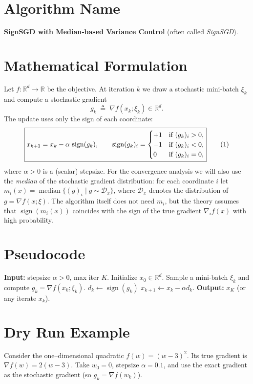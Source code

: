 \documentclass{article}
\newcommand{\sign}{\operatorname{sign}}
\begin{document}
\section*{Algorithm Name}
\textbf{SignSGD with Median‑based Variance Control} (often called \emph{SignSGD}).

\section*{Mathematical Formulation}
Let $f:\mathbb{R}^d\to\mathbb{R}$ be the objective. At iteration $k$ we draw a stochastic mini‑batch $\xi_k$ and compute a stochastic gradient
\[
g_k\;\triangleq\;\nabla f(x_k;\xi_k)\in\mathbb{R}^d .
\]
The update uses only the sign of each coordinate:
\[
\boxed{%
x_{k+1}=x_k-\alpha\,\sign(g_k),\qquad 
\sign(g_k)_i=
\begin{cases}
+1 & \text{if } (g_k)_i>0,\\
-1 & \text{if } (g_k)_i<0,\\
0  & \text{if } (g_k)_i=0,
\end{cases}}
\tag{1}
\]
where $\alpha>0$ is a (scalar) stepsize.  
For the convergence analysis we will also use the \emph{median} of the stochastic gradient distribution: for each coordinate $i$ let $m_i(x)=\operatorname{median}\bigl\{(g)_i\mid g\sim\mathcal{D}_x\bigr\}$, where $\mathcal{D}_x$ denotes the distribution of $g=\nabla f(x;\xi)$. The algorithm itself does not need $m_i$, but the theory assumes that $\sign(m_i(x))$ coincides with the sign of the true gradient $\nabla_i f(x)$ with high probability.

\section*{Pseudocode}
\begin{algorithm}[H]
\caption{SignSGD (Median‑based variance control)}
\begin{algorithmic}[1]
\State \textbf{Input:} stepsize $\alpha>0$, max iter $K$.
\State Initialize $x_0\in\mathbb{R}^d$.
    \State Sample a mini‑batch $\xi_k$ and compute $g_k=\nabla f(x_k;\xi_k)$.
    \State $d_k\gets\sign(g_k)$   
    \State $x_{k+1}\gets x_k-\alpha d_k$.
\EndFor
\State \textbf{Output:} $x_K$ (or any iterate $x_k$).
\end{algorithmic}
\end{algorithm}

\section*{Dry Run Example}
Consider the one–dimensional quadratic $f(w)=(w-3)^2$.  
Its true gradient is $\nabla f(w)=2(w-3)$.  
Take $w_0=0$, stepsize $\alpha=0.1$, and use the exact gradient as the stochastic gradient (so $g_k=\nabla f(w_k)$).
\end{document}

